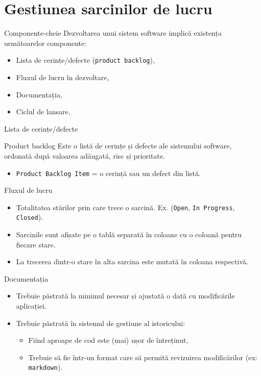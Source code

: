 \documentclass[presentation]{beamer}
\begin{document}
\section{Gestiunea sarcinilor de lucru}
\label{sec:org0dad813}
\begin{frame}[label={sec:org851ea9b},fragile]{Componente-cheie}
 Dezvoltarea unui sistem software implică existența următoarelor componente:
\begin{itemize}
\item Lista de cerințe/defecte (\texttt{product backlog}),
\item Fluxul de lucru în dezvoltare,
\item Documentația,
\item Ciclul de lansare.
\end{itemize}
\end{frame}
\begin{frame}[label={sec:orga4a94b4},fragile]{Lista de cerințe/defecte}
 \begin{block}{Product backlog}
\vskip 0.1in
Este o listă de cerințe și defecte ale sistemului software, ordonată după valoarea adăugată, risc și prioritate.
\vskip 0.1in
\begin{itemize}
\item \texttt{Product Backlog Item} = o cerință sau un defect din listă.
\end{itemize}
\end{block}
\end{frame}
\begin{frame}[label={sec:orgd2ec424},fragile]{Fluxul de lucru}
 \begin{itemize}
\item Totalitatea stărilor prin care trece o sarcină. Ex. (\texttt{Open}, \texttt{In Progress}, \texttt{Closed}).
\item Sarcinile sunt afișate pe o tablă separată în coloane cu o coloană pentru fiecare stare.
\item La trecerea dintr-o stare în alta sarcina este mutată în coloana respectivă.
\end{itemize}
\end{frame}
\begin{frame}[label={sec:orga4079d4},fragile]{Documentația}
 \begin{itemize}
\item Trebuie păstrată la minimul necesar și ajustată o dată cu modificările aplicației.
\item Trebuie păstrată în sistemul de gestiune al istoricului:
\begin{itemize}
\item Fiind aproape de cod este (mai) ușor de întreținut,
\item Trebuie să fie într-un format care să permită revizuirea modificărilor (ex: \texttt{markdown}).
\end{itemize}
\end{itemize}
\end{frame}
\end{document}

